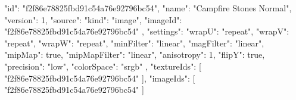 {
  "id": "f2f86e78825fbd91c54a76e92796bc54",
  "name": "Campfire Stones Normal",
  "version": 1,
  "source": {
    "kind": "image",
    "imageId": "f2f86e78825fbd91c54a76e92796bc54"
  },
  "settings": {
    "wrapU": "repeat",
    "wrapV": "repeat",
    "wrapW": "repeat",
    "minFilter": "linear",
    "magFilter": "linear",
    "mipMap": true,
    "mipMapFilter": "linear",
    "anisotropy": 1,
    "flipY": true,
    "precision": "low",
    "colorSpace": "srgb"
  },
  "textureIds": [
    "f2f86e78825fbd91c54a76e92796bc54"
  ],
  "imageIds": [
    "f2f86e78825fbd91c54a76e92796bc54"
  ]
}
